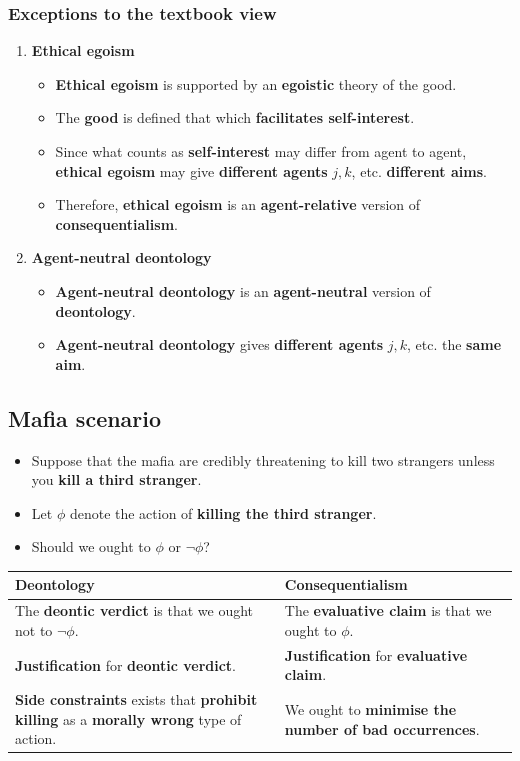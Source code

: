 \documentclass[11pt]{article}
\begin{document}
 \newpage
\subsubsection{Exceptions to the textbook view}
\label{sec:org8cce1f4}
\begin{enumerate}
\item \textbf{Ethical egoism}
\begin{itemize}
\item \textbf{Ethical egoism} is supported by an \textbf{egoistic} theory of the good.
\item The \textbf{good} is defined that which \textbf{facilitates self-interest}.
\item Since what counts as \textbf{self-interest} may differ from agent to agent, \textbf{ethical egoism} may give \textbf{different agents} \(j, k\), etc. \textbf{different aims}.
\item Therefore, \textbf{ethical egoism} is an \textbf{agent-relative} version of \textbf{consequentialism}.
\end{itemize}
\item \textbf{Agent-neutral deontology}
\begin{itemize}
\item \textbf{Agent-neutral deontology} is an \textbf{agent-neutral} version of \textbf{deontology}.
\item \textbf{Agent-neutral deontology} gives \textbf{different agents} \(j, k\), etc. the \textbf{same aim}.
\end{itemize}
\end{enumerate}
\subsection{Mafia scenario}
\label{sec:orgfb2d92e}
\begin{itemize}
\item Suppose that the mafia are credibly threatening to kill two strangers unless you \textbf{kill a third stranger}.
\item Let \(\phi\) denote the action of \textbf{killing the third stranger}.
\item Should we ought to \(\phi\) or \(\neg \phi\)?
\end{itemize}

\begin{center}
\begin{tabularx}{\textwidth}{|X|X|}
\hline
Deontology & Consequentialism\\
\hline
The \textbf{deontic verdict} is that we ought not to \(\neg \phi\). & The \textbf{evaluative claim} is that we ought to \(\phi\).\\
\hline
\textbf{Justification} for \textbf{deontic verdict}. & \textbf{Justification} for \textbf{evaluative claim}.\\
\textbf{Side constraints} exists that \textbf{prohibit killing} as a \textbf{morally wrong} type of action. & We ought to \textbf{minimise the number of bad occurrences}.\\
\hline
\end{tabularx}
\end{center}
\end{document}
